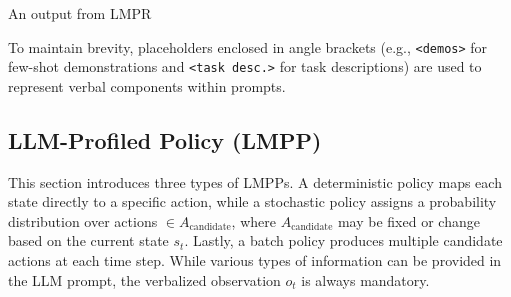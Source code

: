 \begin{myshadowbox} 
An output from LMPR 
\end{myshadowbox}

To maintain brevity, placeholders enclosed in angle brackets (e.g., \texttt{<demos>} for few-shot demonstrations and \texttt{<task desc.>} for task descriptions) are used to represent verbal components within prompts.



\subsection{LLM-Profiled Policy (LMPP)}
\label{sec:policy}
This section introduces three types of LMPPs.
A deterministic policy maps each state directly to a specific action, while a stochastic policy assigns a probability distribution over actions  $ \in  A_{\text{candidate}}$, where $A_{\text{candidate}}$ may be fixed or change based on the current state $s_t$. Lastly, a batch policy produces multiple candidate actions at each time step.
While various types of information can be provided in the LLM prompt, the verbalized observation $o_t$ is always mandatory.
  
